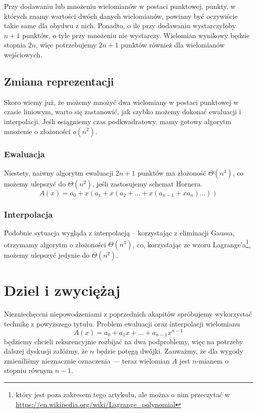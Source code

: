 \documentclass[11pt]{scrartcl}
\begin{document}
    \begin{remark}
        Przy dodawaniu lub mnożeniu wielomianów w postaci punktowej, punkty, w których znamy wartości dwóch danych wielomianów, powinny być oczywiście takie same dla obydwu z nich. Ponadto, o ile przy dodawaniu wystarczyłoby $n + 1$ punktów, o tyle przy mnożeniu nie wystarczy. Wielomian wynikowy będzie stopnia $2n$, więc potrzebujemy $2n + 1$ punktów również dla wielomianów wejściowych.
    \end{remark}

    \subsection{Zmiana reprezentacji}
    Skoro wiemy już, że możemy mnożyć dwa wielomiany w postaci punktowej w czasie liniowym, warto się zastanowić, jak szybko możemy dokonać ewaluacji i interpolacji. Jeśli osiągniemy czas podkwadratowy, mamy gotowy algorytm mnożenie o złożoności $o(n^2)$.

    \subsubsection*{Ewaluacja}
    Niestety, naiwny algorytm ewaluacji $2n + 1$ punktów ma złożoność $\Theta(n^3)$, co możemy ulepszyć do $\Theta(n^2)$, jeśli zastosujemy schemat Hornera.
    $$ A(x) = a_0 + x(a_1 + x(a_2 + \ldots + x(a_{n-1} + xa_n)\ldots))$$

    \subsubsection*{Interpolacja}
    Podobnie sytuacja wygląda z interpolacją -- korzystając z eliminacji Gaussa, otrzymamy algorytm o złożoności $\Theta(n^3)$, co, korzystając ze wzoru Lagrange'a\footnote{który jest poza zakresem tego artykułu, ale można o nim przeczytać w \url{https://en.wikipedia.org/wiki/Lagrange_polynomial}}, możemy ulepszyć jedynie do $\Theta(n^2)$.

\section{Dziel i zwyciężaj}
    Niezniechęceni niepowodzeniami z poprzednich akapitów spróbujemy wykorzystać technikę z powyższego tytułu. Problem ewaluacji oraz interpolacji wielomianu
    $$ A(x) = a_0 + a_1x + \ldots + a_{n-1}x^{n-1} $$
    będziemy chcieli rekurencyjnie rozbijać na dwa podproblemy, więc na potrzeby dalszej dyskusji załóżmy, że $n$ będzie potęgą dwójki. Zauważmy, że dla wygody zmieniliśmy nieznacznie oznaczenia --- teraz wielomian $A$ jest $n$-mianem o stopniu równym $n-1$.
\end{document}
